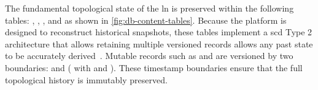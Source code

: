 The fundamental topological state of the \gls{ln} is preserved within the following tables: 
, , , and 
as shown in \autoref{fig:db-content-tables}.
Because the  platform is designed to reconstruct historical snapshots,
these tables implement a \gls{scd} Type 2 architecture that allows retaining multiple 
versioned records allows any past state to be accurately derived~\cite[Chapter~11]{kleppmann_designing_2017}. 
Mutable records such as  and  
are versioned by two boundaries:  and  
( with  and ).
These timestamp boundaries ensure that the full topological history is immutably preserved.


